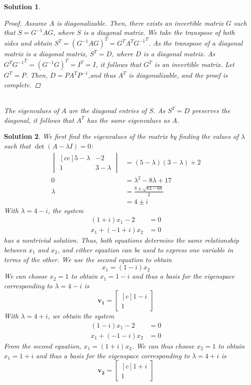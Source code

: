 \documentclass[11pt]{scrartcl}
\theoremstyle{dotlessP}
\newtheorem{sol}{Solution}[section]
\theoremstyle{dotlessN}
\begin{document}
\begin{sol}
	\begin{proof}
		Assume $A$ is diagonalizable. Then, there exists an invertible matrix $G$ such that $S = G^{-1}AG$, where $S$ is a diagonal matrix. We take the transpose of both sides and obtain $S^T = (G^{-1}AG)^T = G^T A^T {G^{-1}}^T$. As  the transpose of a diagonal matrix is a diagonal matrix, $S^T = D$, where $D$ is a diagonal matrix. As $G^T {G^{-1}}^T = (G^{-1}G)^T = I^T = I$, it follows that  $G^{T}$ is an invertible matrix. Let $G^T = P$. Then, $D = PA^TP^{-1}$,and thus $A^{T}$ is diagonalizable, and the proof is complete.
	\end{proof}
\	\\
	The eigenvalues of $A$ are the diagonal entries of $S$. As $S^T = D$ preserves the diagonal, it follows that $A^T$ has the same eigenvalues as $A$.
\end{sol}
\begin{sol}
	We first find the eigenvalues of the matrix by finding the values of $\lambda$ such that $\det(A - \lambda I) = 0$:
	\begin{align*}
		\begin{vmatrix}[cc]
			5 - \lambda & -2 \\
			1 & 3 - \lambda
		\end{vmatrix} &= (5-\lambda)(3-\lambda) + 2 \\
		0 &= \lambda^2 - 8\lambda + 17 \\
		\lambda &= 
		\frac{8 \pm \sqrt{64 - 68}}{2} \\
				&= 4 \pm i
	\end{align*}
	With $\lambda = 4 - i$, the system
	\begin{align*}
		(1 + i)x_1 -2 &= 0 \\
		x_1  + (-1 +i)x_2 &= 0
	\end{align*}
	has a nontrivial solution. Thus, both equations determine the same relationship between $x_1$ and $x_2$, and either equation can be used to express one variable in terms of the other. We use the second equation to obtain
	\[
	x_1 = (1-i)x_2
	\] 
	We can choose $x_2 = 1$ to obtain $x_1 = 1-i$ and thus a basis for the eigenspace corresponding to $\lambda = 4 - i$ is
	\[
		\bm{v_1} = 
		\begin{bmatrix}[c]
			1 - i \\
			1
		\end{bmatrix}
	\] 
	With $\lambda = 4 + i$, we obtain the system
	\begin{align*}
		(1 - i)x_1 - 2 &= 0 \\
		x_1 + (-1 - i)x_2 &= 0 
	\end{align*}
	From the second equation, $x_1 = (1+i)x_2$. We can thus choose $x_2 = 1$ to obtain $x_1 = 1 + i$ and thus a basis for the eigenspace corresponding to $\lambda = 4 + i$ is
	\[
		\bm{v_2} = 
		\begin{bmatrix}[c]
		1 + i \\
		1
		\end{bmatrix}
	\] 
\end{sol}
\end{document}
